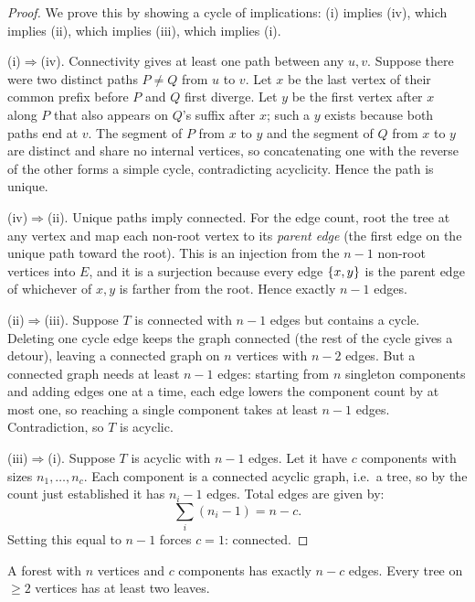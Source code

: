 \begin{proof}
We prove this by showing a cycle of implications: (i) implies (iv), which implies (ii), which implies (iii), which implies (i).

(i)$\Rightarrow$(iv). Connectivity gives at least one path between any $u,v$.
Suppose there were two distinct paths $P \neq Q$ from $u$ to $v$. Let $x$ be the
last vertex of their common prefix before $P$ and $Q$ first diverge. Let $y$ be
the first vertex after $x$ along $P$ that also appears on $Q$'s suffix after $x$;
such a $y$ exists because both paths end at $v$. The segment of $P$ from $x$ to
$y$ and the segment of $Q$ from $x$ to $y$ are distinct and share no internal
vertices, so concatenating one with the reverse of the other forms a simple cycle,
contradicting acyclicity. Hence the path is unique.

(iv)$\Rightarrow$(ii). Unique paths imply connected. For the edge count, root
the tree at any vertex and map each non-root vertex to its \emph{parent edge}
(the first edge on the unique path toward the root). This is an injection from
the $n-1$ non-root vertices into $E$, and it is a surjection because every edge
$\{x,y\}$ is the parent edge of whichever of $x,y$ is farther from the root.
Hence exactly $n-1$ edges.

(ii)$\Rightarrow$(iii). Suppose $T$ is connected with $n-1$ edges but contains a
cycle. Deleting one cycle edge keeps the graph connected (the rest of the cycle
gives a detour), leaving a connected graph on $n$ vertices with $n-2$ edges. But
a connected graph needs at least $n-1$ edges: starting from $n$ singleton
components and adding edges one at a time, each edge lowers the component count
by at most one, so reaching a single component takes at least $n-1$ edges.
Contradiction, so $T$ is acyclic.

(iii)$\Rightarrow$(i). Suppose $T$ is acyclic with $n-1$ edges. Let it have $c$
components with sizes $n_1, \dots, n_c$. Each component is a connected acyclic
graph, i.e.\ a tree, so by the count just established it has $n_i - 1$ edges.
Total edges are given by:
\[ \sum_i (n_i - 1) = n - c. \]
Setting this equal to $n-1$ forces
$c = 1$: connected.
\end{proof}

\begin{corollary}
\label{ch01:forest-count}
A forest with $n$ vertices and $c$ components has exactly $n - c$ edges. Every
tree on $\ge 2$ vertices has at least two leaves.
\end{corollary}

